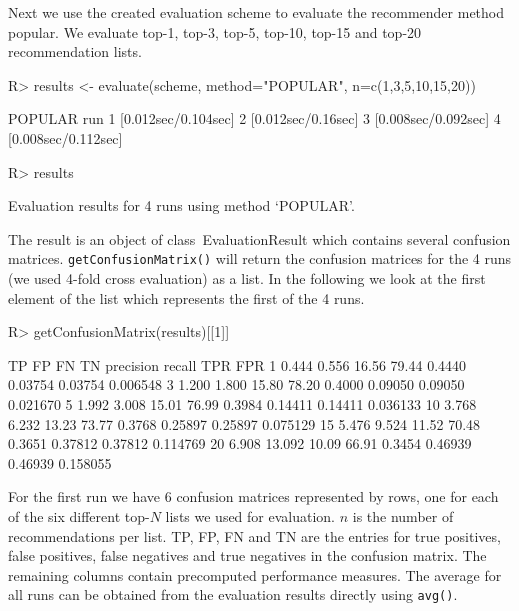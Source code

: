 \documentclass[nojss]{jss}
\newcommand{\class}[1]{\mbox{\textsf{#1}}}
\newcommand{\func}[1]{\mbox{\texttt{#1()}}}
\begin{document}
Next we use the created evaluation scheme to evaluate the recommender
method popular.
We evaluate top-1, top-3, top-5, top-10, top-15 and top-20 recommendation lists.

\begin{Schunk}
\begin{Sinput}
R> results <- evaluate(scheme, method="POPULAR", n=c(1,3,5,10,15,20))
\end{Sinput}
\begin{Soutput}
POPULAR run
	 1  [0.012sec/0.104sec]
	 2  [0.012sec/0.16sec]
	 3  [0.008sec/0.092sec]
	 4  [0.008sec/0.112sec]
\end{Soutput}
\begin{Sinput}
R> results
\end{Sinput}
\begin{Soutput}
Evaluation results for 4 runs using method ‘POPULAR’.
\end{Soutput}
\end{Schunk}

The result is an object of class~\class{EvaluationResult} which
contains several confusion matrices. \func{getConfusionMatrix}
will return the confusion matrices for the 4 runs
(we used 4-fold cross evaluation) as a list.
In the following we look at the first element of the list which
represents the first of the 4 runs.


\begin{Schunk}
\begin{Sinput}
R> getConfusionMatrix(results)[[1]]
\end{Sinput}
\begin{Soutput}
      TP     FP    FN    TN precision  recall     TPR      FPR
1  0.444  0.556 16.56 79.44    0.4440 0.03754 0.03754 0.006548
3  1.200  1.800 15.80 78.20    0.4000 0.09050 0.09050 0.021670
5  1.992  3.008 15.01 76.99    0.3984 0.14411 0.14411 0.036133
10 3.768  6.232 13.23 73.77    0.3768 0.25897 0.25897 0.075129
15 5.476  9.524 11.52 70.48    0.3651 0.37812 0.37812 0.114769
20 6.908 13.092 10.09 66.91    0.3454 0.46939 0.46939 0.158055
\end{Soutput}
\end{Schunk}

For the first run we have 6 confusion matrices represented by rows, one for each
of the six different top-$N$ lists we used for evaluation.
$n$ is the number of recommendations per list. TP, FP, FN and TN are the
entries for
true positives, false positives, false negatives and true negatives in
the confusion matrix. The remaining columns contain precomputed performance
measures. The average for all runs can be obtained
from the evaluation results directly using \func{avg}.
\end{document}
